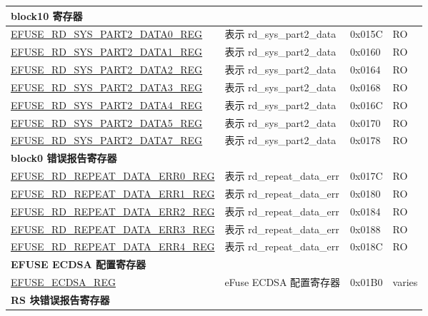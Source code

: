 \begin{longtable}{ | p{7cm} | p{6cm} | p{1.2cm} | p{1.5cm} | }
\multicolumn{4}{|l|}{\textbf{block10 寄存器}} \\ \hline
\hyperref[regdesc:EFUSERDSYSPART2DATANREG]{EFUSE\_RD\_SYS\_PART2\_DATA0\_REG} & 表示 rd\_sys\_part2\_data & 0x015C & RO \\ \hline
\hyperref[regdesc:EFUSERDSYSPART2DATANREG]{EFUSE\_RD\_SYS\_PART2\_DATA1\_REG} & 表示 rd\_sys\_part2\_data & 0x0160 & RO \\ \hline
\hyperref[regdesc:EFUSERDSYSPART2DATANREG]{EFUSE\_RD\_SYS\_PART2\_DATA2\_REG} & 表示 rd\_sys\_part2\_data & 0x0164 & RO \\ \hline
\hyperref[regdesc:EFUSERDSYSPART2DATANREG]{EFUSE\_RD\_SYS\_PART2\_DATA3\_REG} & 表示 rd\_sys\_part2\_data & 0x0168 & RO \\ \hline
\hyperref[regdesc:EFUSERDSYSPART2DATANREG]{EFUSE\_RD\_SYS\_PART2\_DATA4\_REG} & 表示 rd\_sys\_part2\_data & 0x016C & RO \\ \hline
\hyperref[regdesc:EFUSERDSYSPART2DATANREG]{EFUSE\_RD\_SYS\_PART2\_DATA5\_REG} & 表示 rd\_sys\_part2\_data & 0x0170 & RO \\ \hline
\hyperref[regdesc:EFUSERDSYSPART2DATA7REG]{EFUSE\_RD\_SYS\_PART2\_DATA7\_REG} & 表示 rd\_sys\_part2\_data & 0x0178 & RO \\ \hline
\multicolumn{4}{|l|}{\textbf{block0 错误报告寄存器}} \\ \hline
\hyperref[regdesc:EFUSERDREPEATDATAERR0REG]{EFUSE\_RD\_REPEAT\_DATA\_ERR0\_REG} & 表示 rd\_repeat\_data\_err & 0x017C & RO \\ \hline
\hyperref[regdesc:EFUSERDREPEATDATAERR1REG]{EFUSE\_RD\_REPEAT\_DATA\_ERR1\_REG} & 表示 rd\_repeat\_data\_err & 0x0180 & RO \\ \hline
\hyperref[regdesc:EFUSERDREPEATDATAERR2REG]{EFUSE\_RD\_REPEAT\_DATA\_ERR2\_REG} & 表示 rd\_repeat\_data\_err & 0x0184 & RO \\ \hline
\hyperref[regdesc:EFUSERDREPEATDATAERR3REG]{EFUSE\_RD\_REPEAT\_DATA\_ERR3\_REG} & 表示 rd\_repeat\_data\_err & 0x0188 & RO \\ \hline
\hyperref[regdesc:EFUSERDREPEATDATAERR4REG]{EFUSE\_RD\_REPEAT\_DATA\_ERR4\_REG} & 表示 rd\_repeat\_data\_err & 0x018C & RO \\ \hline
\multicolumn{4}{|l|}{\textbf{EFUSE ECDSA 配置寄存器}} \\ \hline
\hyperref[regdesc:EFUSEECDSAREG]{EFUSE\_ECDSA\_REG} & eFuse ECDSA 配置寄存器 & 0x01B0 & varies \\ \hline
\multicolumn{4}{|l|}{\textbf{RS 块错误报告寄存器}} \\ \hline

\end{longtable}
